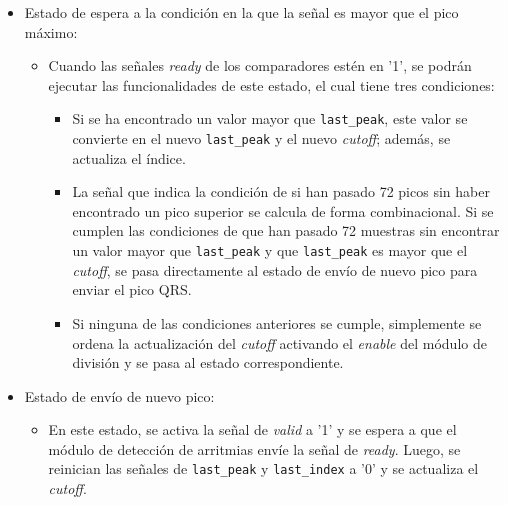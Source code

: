 \begin{itemize}
    \item Estado de espera a la condición en la que la señal es mayor que el pico máximo: 
    \begin{itemize}
        \item Cuando las señales \textit{ready} de los comparadores estén en '1', se podrán ejecutar las funcionalidades de este estado, el cual tiene tres condiciones:
        \begin{itemize}
            \item Si se ha encontrado un valor mayor que \texttt{last\_peak}, este valor se convierte en el nuevo \texttt{last\_peak} y el nuevo \textit{cutoff}; además, se actualiza el índice. 
            \item La señal que indica la condición de si han pasado 72 picos sin haber encontrado un pico superior se calcula de forma combinacional. Si se cumplen las condiciones de que han pasado 72 muestras sin encontrar un valor mayor que \texttt{last\_peak} y que \texttt{last\_peak} es mayor que el \textit{cutoff}, se pasa directamente al estado de envío de nuevo pico para enviar el pico QRS.
            \item Si ninguna de las condiciones anteriores se cumple, simplemente se ordena la actualización del \textit{cutoff} activando el \textit{enable} del módulo de división y se pasa al estado correspondiente.
        \end{itemize}
    \end{itemize}
    \item Estado de envío de nuevo pico:
    \begin{itemize}
        \item En este estado, se activa la señal de \textit{valid} a '1' y se espera a que el módulo de detección de arritmias envíe la señal de \textit{ready}. Luego, se reinician las señales de \texttt{last\_peak} y \texttt{last\_index} a '0' y se actualiza el \textit{cutoff}.
    \end{itemize}
\end{itemize}

